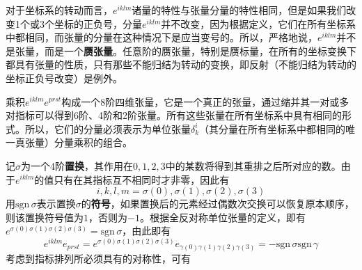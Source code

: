 对于坐标系的转动而言，$e^{iklm}$诸量的特性与张量分量的特性相同，但是如果我们改变1个或3个坐标的正负号，分量$e^{iklm}$并不改变，因为根据定义，它们在所有坐标系中都相同，而张量的分量在这种情况下是应当变号的。所以，严格地说，$e^{iklm}$并不是张量，而是一个{\bf 赝张量}。任意阶的赝张量，特别是赝标量，在所有的坐标变换下都具有张量的性质，只有那些不能归结为转动的变换，即反射（不能归结为转动的坐标正负号改变）是例外。

乘积$e^{iklm}e^{prst}$构成一个8阶四维张量，它是一个真正的张量，通过缩并其一对或多对指标可以得到6阶、4阶和2阶张量。所有这些张量在所有坐标系中具有相同的形式。所以，它们的分量必须表示为单位张量$\delta^i_k$（其分量在所有坐标系中都相同的唯一真张量）分量乘积的组合。%

记$\sigma$为一个4阶{\bf 置换}，其作用在$0,1,2,3$中的某数将得到其重排之后所对应的数。由于$e^{iklm}$的值只有在其指标互不相同时才非零，因此有
\begin{equation*}
	i,k,l,m = \sigma(0),\sigma(1),\sigma(2),\sigma(3)
\end{equation*}
用$\mathrm{sgn}\,\sigma$表示置换$\sigma$的{\bf 符号}，如果置换后的元素经过偶数次交换可以恢复原本顺序，则该置换符号值为$1$，否则为$-1$。根据全反对称单位张量的定义，即有$e^{\sigma(0)\sigma(1)\sigma(2)\sigma(3)} = \mathrm{sgn}\,\sigma$，由此即有
\begin{equation*}
	e^{iklm}e_{prst} = e^{\sigma(0)\sigma(1)\sigma(2)\sigma(3)} e_{\gamma(0)\gamma(1)\gamma(2)\gamma(3)} = -\mathrm{sgn}\,\sigma \mathrm{sgn}\,\gamma
\end{equation*}
考虑到指标排列所必须具有的对称性，可有
